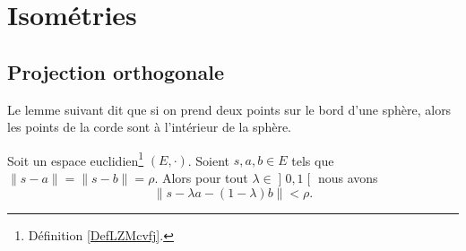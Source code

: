 

\section{Isométries}

\subsection{Projection orthogonale}

Le lemme suivant dit que si on prend deux points sur le bord d'une sphère, alors les points de la corde sont à l'intérieur de la sphère.
\begin{lemma}	\label{LEMooKVBWooTxzZOx}
	Soit un espace euclidien\footnote{Définition \ref{DefLZMcvfj}.} \( (E,\cdot)\). Soient \( s,a,b\in E\) tels que \( \| s-a \|=\| s-b \|=\rho\). Alors pour tout \( \lambda\in \mathopen] 0,1\mathclose[\) nous avons
	\begin{equation}
		\| s-\lambda a-(1-\lambda)b \|<\rho.
	\end{equation}
\end{lemma}

